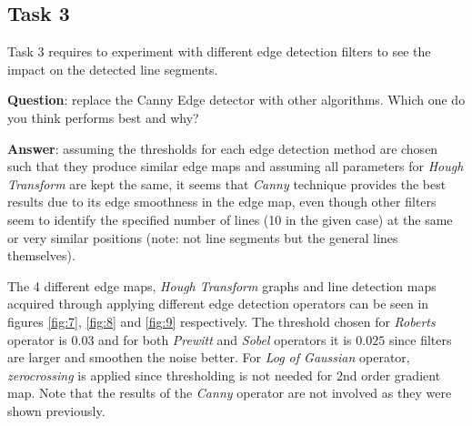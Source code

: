 \documentclass[lettersize,journal]{IEEEtran}
\begin{document}
\subsection{Task 3}

\noindent Task 3 requires to experiment with different edge detection filters to see the impact on the detected line segments.

\hfill

\noindent\textbf{Question}: replace the Canny Edge detector with other algorithms. Which one do you think performs
best and why?

\hfill

\noindent\textbf{Answer}: assuming the thresholds for each edge detection method are chosen such that they produce similar edge maps and assuming all parameters for \emph{Hough Transform} are kept the same, it seems that \emph{Canny} technique provides the best results due to its edge smoothness in the edge map, even though other filters seem to identify the specified number of lines (10 in the given case) at the same or very similar positions (note: not line segments but the general lines themselves).

\hfill

\noindent The 4 different edge maps, \emph{Hough Transform} graphs and line detection maps acquired through applying different edge detection operators can be seen in figures \ref{fig:7}, \ref{fig:8} and \ref{fig:9} respectively. The threshold chosen for \emph{Roberts} operator is $0.03$ and for both \emph{Prewitt} and \emph{Sobel} operators it is $0.025$ since filters are larger and smoothen the noise better. For \emph{Log of Gaussian} operator, \emph{zerocrossing} is applied since thresholding is not needed for 2nd order gradient map. Note that the results of the \emph{Canny} operator are not involved as they were shown previously.

\newpage
\end{document}
